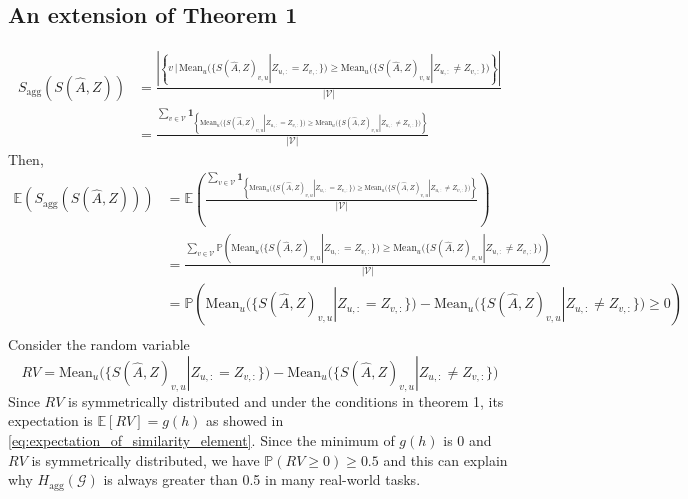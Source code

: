 \documentclass{article}
\newcommand{\0}{{\boldsymbol{0}}}
\newcommand{\6}{{\partial}}
\newcommand{\8}{{\infty}}
\newcommand{\4}{{\nabla}}
\begin{document}
\subsection{An extension of Theorem 1}
\begin{align*}
    S_\text{agg}\left(S(\hat{A},Z)\right) &= \frac{\left| \left\{v   \,\big| \,
    \mathrm{Mean}_u\big( \{S(\hat{A},Z)_{v,u} | Z_{u,:}=Z_{v,:} \}\big) 
    \geq \mathrm{Mean}_u\big(\{S(\hat{A},Z)_{v,u} | Z_{u,:} \neq Z_{v,:} \} \big) \right\} \right|}{\left| \mathcal{V} \right|}\\
    & = \frac{ \sum\limits_{v\in \mathcal{V}} \bm{1}_{ \left\{
    \mathrm{Mean}_u \big( \{S(\hat{A},Z)_{v,u} | Z_{u,:}=Z_{v,:} \}\big) 
    \geq \mathrm{Mean}_u\big(\{S(\hat{A},Z)_{v,u} | Z_{u,:} \neq Z_{v,:} \} \big) \right\}}}{\left| \mathcal{V} \right|}
\end{align*}
Then,
\begin{align*}
    \mathbb{E}\left(S_\text{agg}\left(S(\hat{A},Z)\right)\right) & = \mathbb{E} \left(\frac{ \sum\limits_{v\in \mathcal{V}} \bm{1}_{ \left\{
    \mathrm{Mean}_u \big( \{S(\hat{A},Z)_{v,u} | Z_{u,:}=Z_{v,:} \}\big) 
    \geq \mathrm{Mean}_u\big(\{S(\hat{A},Z)_{v,u} | Z_{u,:} \neq Z_{v,:} \} \big) \right\}}}{\left| \mathcal{V} \right|} \right)\\
    & =  \frac{ \sum\limits_{v\in \mathcal{V}} \mathbb{P}\left(  
    \mathrm{Mean}_u \big( \{S(\hat{A},Z)_{v,u} | Z_{u,:}=Z_{v,:} \}\big) 
    \geq \mathrm{Mean}_u\big(\{S(\hat{A},Z)_{v,u} | Z_{u,:} \neq Z_{v,:} \} \big)   \right)}{\left| \mathcal{V} \right|}  \\
    & = \mathbb{P}\left(\mathrm{Mean}_u \big( \{S(\hat{A},Z)_{v,u} | Z_{u,:}=Z_{v,:} \}\big) - \mathrm{Mean}_u\big(\{S(\hat{A},Z)_{v,u} | Z_{u,:} \neq Z_{v,:} \} \big) \geq 0 \right) \\
\end{align*}
Consider the random variable
\begin{equation*}
    RV = \mathrm{Mean}_u \big( \{S(\hat{A},Z)_{v,u} | Z_{u,:}=Z_{v,:} \}\big) - \mathrm{Mean}_u\big(\{S(\hat{A},Z)_{v,u} | Z_{u,:} \neq Z_{v,:} \} \big)
\end{equation*}
Since $RV$ is symmetrically distributed and under the conditions in theorem 1, its expectation is $\mathbb{E}[RV] = g(h)$ as showed in \eqref{eq:expectation_of_similarity_element}. Since the minimum of $g(h)$ is $0$ and $RV$ is symmetrically distributed, we have $\mathbb{P}(RV \geq 0) \geq 0.5$ and this can explain why $H_{\text{agg}}(\mathcal{G})$ is always greater than 0.5 in many real-world tasks.
\end{document}
